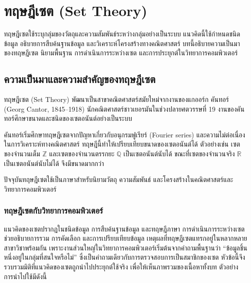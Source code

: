 \chapter{ทฤษฎีเซต (Set Theory)}
\label{ch:set}

ทฤษฎีเซตใช้ระบุกลุ่มของวัตถุและความสัมพันธ์ระหว่างกลุ่มอย่างเป็นระบบ แนวคิดนี้ใช้กำหนดชนิดข้อมูล อธิบายการสืบค้นฐานข้อมูล และวิเคราะห์โครงสร้างทางคณิตศาสตร์ บทนี้อธิบายความเป็นมาของทฤษฎีเซต นิยามพื้นฐาน การดำเนินการระหว่างเซต และการประยุกต์ในวิทยาการคอมพิวเตอร์

\section{ความเป็นมาและความสำคัญของทฤษฎีเซต}
\label{sec:set-intro}
ทฤษฎีเซต (Set Theory) พัฒนาเป็นสาขาคณิตศาสตร์สมัยใหม่จากงานของแกออร์ก คันทอร์ (Georg Cantor, 1845--1918) นักคณิตศาสตร์ชาวเยอรมันในช่วงปลายศตวรรษที่ 19 งานของคันทอร์ศึกษาขนาดและชนิดของเซตอนันต์อย่างเป็นระบบ~\parencite{halmos1974naive}

คันทอร์เริ่มศึกษาทฤษฎีเซตจากปัญหาเกี่ยวกับอนุกรมฟูเรียร์ (Fourier series) และความไม่ต่อเนื่องในการวิเคราะห์ทางคณิตศาสตร์ ทฤษฎีนี้ทำให้เปรียบเทียบขนาดของเซตอนันต์ได้ ตัวอย่างเช่น เซตของจำนวนเต็ม $\mathbb{Z}$ และเซตของจำนวนตรรกยะ $\mathbb{Q}$ เป็นเซตอนันต์นับได้ ขณะที่เซตของจำนวนจริง $\mathbb{R}$ เป็นเซตอนันต์นับไม่ได้ จึงมีขนาดมากกว่า

ปัจจุบันทฤษฎีเซตใช้เป็นภาษาสำหรับนิยามวัตถุ ความสัมพันธ์ และโครงสร้างในคณิตศาสตร์และวิทยาการคอมพิวเตอร์~\parencite{halmos1974naive}

\subsection{ทฤษฎีเซตกับวิทยาการคอมพิวเตอร์}
แนวคิดของเซตปรากฏในชนิดข้อมูล การสืบค้นฐานข้อมูล และทฤษฎีภาษา การดำเนินการระหว่างเซตช่วยอธิบายการรวม การคัดเลือก และการเปรียบเทียบข้อมูล เหตุผลที่ทฤษฎีเซตแทรกอยู่ในหลากหลายสาขาวิชาพร้อมกัน เพราะงานส่วนใหญ่ในวิทยาการคอมพิวเตอร์เริ่มต้นจากคำถามพื้นฐานว่า ``ข้อมูลชิ้นหนึ่งอยู่ในกลุ่มที่สนใจหรือไม่'' ซึ่งเป็นคำถามเดียวกับการตรวจสอบการเป็นสมาชิกของเซต หัวข้อนี้จึงรวบรวมมิติที่แนวคิดของเซตถูกนำไปประยุกต์ใช้จริง เพื่อให้เห็นภาพรวมของเนื้อหาทั้งบท ตัวอย่างการนำไปใช้มีดังนี้~\parencite{gersting2014structures}

